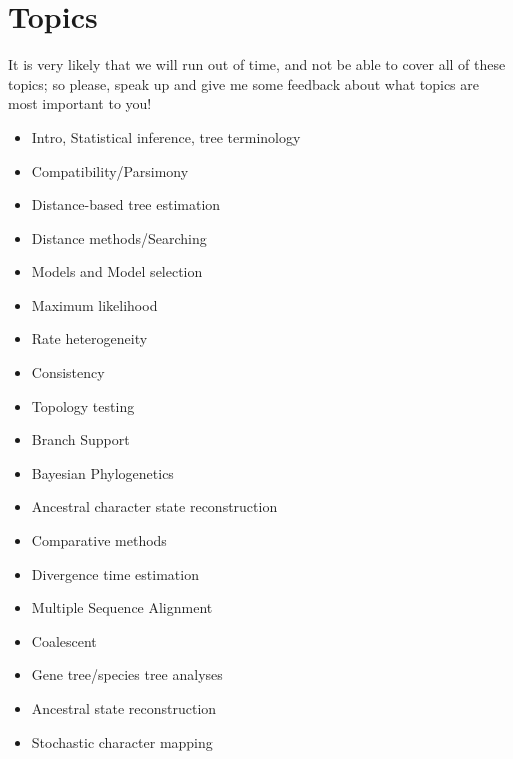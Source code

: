 \documentclass{article}
\begin{document}
{\section*{Topics}
It is very likely that we will run out of time, and not be able to cover all of these topics; so
please, speak up and give me some feedback about what topics are most important to you!\\
\begin{itemize}
 \item Intro, Statistical inference, tree terminology
 \item Compatibility/Parsimony
 \item Distance-based tree estimation
 \item Distance methods/Searching
 \item Models and Model selection
 \item Maximum likelihood
 \item Rate heterogeneity
 \item Consistency
 \item Topology testing
 \item Branch Support
 \item Bayesian Phylogenetics
 \item Ancestral character state reconstruction
 \item Comparative methods
 \item Divergence time estimation
 \item Multiple Sequence Alignment
 \item Coalescent
 \item Gene tree/species tree analyses
 \item Ancestral state reconstruction
 \item Stochastic character mapping
\end{itemize}


}
\end{document}
